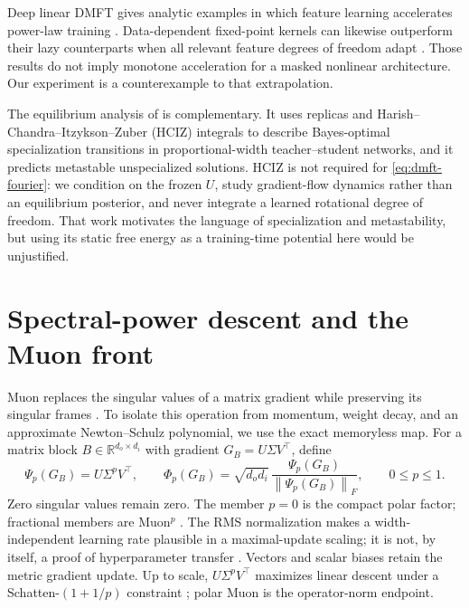\documentclass[11pt]{article}
\newcommand{\R}{\mathbb R}
\newcommand{\1}{\mathbf 1}
\newcommand{\norm}[1]{\left\lVert #1\right\rVert}
\theoremstyle{plain}
\theoremstyle{definition}
\begin{document}
Deep linear DMFT gives analytic examples in which feature learning
accelerates power-law training \citep{bordelon2025deep}.  Data-dependent
fixed-point kernels can likewise outperform their lazy counterparts when
all relevant feature degrees of freedom adapt \citep{lauditi2025adaptive}.
Those results do not imply monotone acceleration for a masked nonlinear
architecture.  Our experiment is a counterexample to that extrapolation.

The equilibrium analysis of \citet{barbier2026statphys} is complementary.
It uses replicas and Harish--Chandra--Itzykson--Zuber (HCIZ) integrals to
describe Bayes-optimal specialization transitions in proportional-width
teacher--student networks, and it predicts metastable unspecialized
solutions.  HCIZ is not required for \eqref{eq:dmft-fourier}: we condition on
the frozen \(U\), study gradient-flow dynamics rather than an equilibrium
posterior, and never integrate a learned rotational degree of freedom.  That
work motivates the language of specialization and metastability, but using
its static free energy as a training-time potential here would be
unjustified.

\section{Spectral-power descent and the Muon front}
\label{sec:muon}

Muon replaces the singular values of a matrix gradient while preserving its
singular frames \citep{jordan2024muon}.  To isolate this operation from
momentum, weight decay, and an approximate Newton--Schulz polynomial, we use
the exact memoryless map.  For a matrix block \(B\in\R^{d_o\times d_i}\)
with gradient \(G_B=U\Sigma V^\top\), define
\begin{equation}
 \Psi_p(G_B)=U\Sigma^pV^\top,
 \qquad
 \Phi_p(G_B)=\sqrt{d_od_i}\,
 \frac{\Psi_p(G_B)}{\norm{\Psi_p(G_B)}_F},
 \qquad 0\leq p\leq1.
 \label{eq:muon-map}
\end{equation}
Zero singular values remain zero.  The member \(p=0\) is the compact polar
factor; fractional members are Muon\({}^p\) \citep{dong2026muonp}.  The RMS
normalization makes a width-independent learning rate plausible in a
maximal-update scaling; it is not, by itself, a proof of hyperparameter
transfer \citep{zhao2026principled}.  Vectors and scalar biases retain the
metric gradient update.  Up to scale, \(U\Sigma^pV^\top\) maximizes linear
descent under a Schatten-\((1+1/p)\) constraint
\citep{dong2026muonp}; polar Muon is the operator-norm endpoint.
\end{document}

